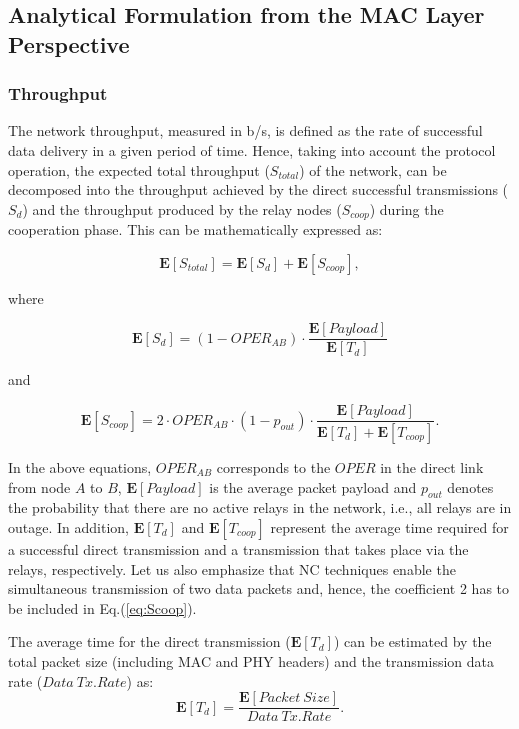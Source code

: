 \documentclass[12pt,draftcls, onecolumn]{IEEEtran}
\begin{document}
\subsection{Analytical Formulation from the MAC Layer Perspective}
\label{sec:analysis_mac}

\subsubsection{Throughput}
\label{sec:throughput}

The network throughput, measured in b/s, is defined as the rate of successful data delivery in a given period of time. Hence, taking into account the protocol operation, the expected total throughput ($S_{total}$) of the network, can be decomposed into the throughput achieved by the direct successful transmissions ($S_d$) and the throughput produced by the relay nodes ($S_{coop}$) during the cooperation phase. This can be mathematically expressed as:

\begin{equation}
\label{eq:Stotal}
 	\mathbf{E}[S_{total}]=\mathbf{E}[S_{d}]+\mathbf{E}[S_{coop}],
\end{equation}

where

\begin{equation}
\label{eq:SD}
 	\mathbf{E}[S_{d}]=(1-OPER_{AB})\cdot \frac{\mathbf{E}[Payload]}{\mathbf{E}[T_d]}
\end{equation}

and

\begin{equation}
\label{eq:Scoop}
 	\mathbf{E}[S_{coop}]=2\cdot OPER_{AB}\cdot (1-p_{out})\cdot \frac{\mathbf{E}[Payload]}{\mathbf{E}[T_{d}]+\mathbf{E}[T_{coop}]}.
\end{equation}

In the above equations, $OPER_{AB}$ corresponds to the $OPER$ in the direct link from node $A$ to $B$, $\mathbf{E}[Payload]$ is the average packet payload and $p_{out}$ denotes the probability that there are no active relays in the network, i.e., all relays are in outage. In addition, $\mathbf{E}[T_d]$ and $\mathbf{E}[T_{coop}]$ represent the average time required for a successful direct transmission and a transmission that takes place via the relays, respectively. Let us also emphasize that NC techniques enable the simultaneous transmission of two data packets and, hence, the coefficient 2 has to be included in Eq.(\ref{eq:Scoop}).

The average time for the direct transmission ($\mathbf{E}[T_d]$) can be estimated by the total packet size (including MAC and PHY headers) and the transmission data rate ($Data\ Tx.Rate$) as:
\begin{equation}
\label{eq:Td}
 	\mathbf{E}[T_d]= \frac{\mathbf{E}[Packet\ Size]}{Data\ Tx.Rate}.
\end{equation}
\end{document}
